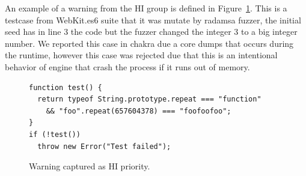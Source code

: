 \documentclass[10pt,conference,anonymous]{IEEEtran}
\begin{document}
An example of a warning from the HI group is defined in Figure~\ref{fig:hi-priority}. 
This is a testcase from WebKit.es6 suite that it was mutate by radamsa fuzzer, the 
initial seed has in line 3 the code  but the fuzzer changed the 
integer 3 to a big integer number. We reported this case in chakra due a core dumps that occurs
during the runtime, however this case was rejected due  that
this is an intentional behavior of engine that crash the process if it runs out of memory.

\begin{figure}[h!]
  \centering
  \scriptsize
  \begin{lstlisting}
function test() {
  return typeof String.prototype.repeat === "function"
    && "foo".repeat(657604378) === "foofoofoo";
}
if (!test())
  throw new Error("Test failed");
  \end{lstlisting}
  \normalsize
  \caption{Warning captured as HI priority.}
  \label{fig:hi-priority}
  \end{figure}
\end{document}
